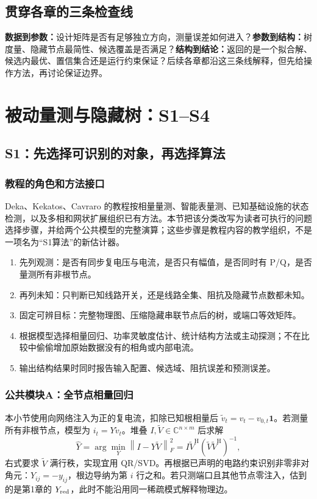 \documentclass[UTF8,11pt,fontset=fandol,openany,oneside]{ctexbook}
\newcommand{\norm}[1]{\left\lVert#1\right\rVert}
\theoremstyle{definition}
\theoremstyle{remark}
\numberwithin{equation}{chapter}
\begin{document}
\section{贯穿各章的三条检查线}
\textbf{数据到参数：}设计矩阵是否有足够独立方向，测量误差如何进入？\textbf{参数到结构：}树度量、隐藏节点最简性、候选覆盖是否满足？\textbf{结构到结论：}返回的是一个拟合解、候选内最优、置信集合还是运行约束保证？后续各章都沿这三条线解释，但先给操作方法，再讨论保证边界。



\chapter{被动量测与隐藏树：S1--S4}
\label{ch:passive}
\section{S1：先选择可识别的对象，再选择算法}
\subsection{教程的角色和方法接口}
Deka、Kekatos、Cavraro 的教程\citep{S1}按相量量测、智能表量测、已知基础设施的状态检测，以及多相和网状扩展组织已有方法。本节把该分类改写为读者可执行的问题选择步骤，并给两个公共模型的完整演算；这些步骤是教程内容的教学组织，不是一项名为“S1算法”的新估计器。

\begin{enumerate}
\item 先列观测：是否有同步复电压与电流，是否只有幅值，是否同时有 P/Q，是否量测所有非根节点。
\item 再列未知：只判断已知线路开关，还是线路全集、阻抗及隐藏节点数都未知。
\item 固定可辨目标：完整物理图、压缩隐藏串联节点后的树，或端口等效矩阵。
\item 根据模型选择相量回归、功率灵敏度估计、统计结构方法或主动探测；不在比较中偷偷增加原始数据没有的相角或内部电流。
\item 输出结构结果时同时报告输入配置、候选域、阻抗误差和预测误差。
\end{enumerate}

\subsection{公共模块A：全节点相量回归}
本小节使用向网络注入为正的复电流，扣除已知根相量后 $\widetilde v_t=v_t-v_{0,t}\mathbf1$。若测量所有非根节点，模型为 $i_t=Y\widetilde v_t$。堆叠 $I,\widetilde V\in\mathbb C^{n\times m}$ 后求解
\begin{equation}
 \widehat Y=\arg\min_Y\norm{I-Y\widetilde V}_F^2
 =I\widetilde V^{\mathrm H}(\widetilde V\widetilde V^{\mathrm H})^{-1},
 \label{eq:tb-phasor-ls}
\end{equation}
右式要求 $\widetilde V$ 满行秩，实现宜用 QR/SVD。再根据已声明的电路约束识别非零非对角元：$Y_{ij}=-y_{ij}$，根边导纳为第 $i$ 行之和。若只测端口且其他节点零注入，估到的是第1章的 $Y_{\rm red}$，此时不能沿用同一稀疏模式解释物理边。
\end{document}
